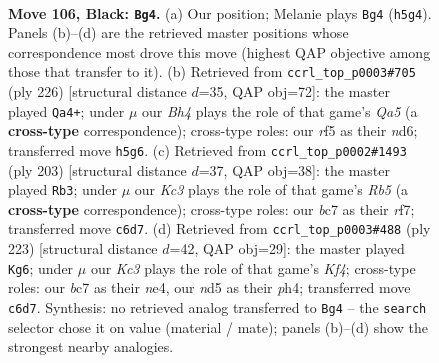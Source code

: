 \documentclass[11pt]{article}
\begin{document}
\clearpage

\begin{figure}[p]\centering
\begin{subfigure}{0.46\textwidth}\centering
\resizebox{\linewidth}{!}{%
\newchessgame
\chessboard[
  setfen={8/2B5/PPk5/3N1R1b/1K6/7p/8/8 b - - 0 106},
  showmover=false,
  pgfstyle=straightmove, color=movearrow, markmove={h5-g4}
]}
\caption{}
\end{subfigure}\hfill
\begin{subfigure}{0.46\textwidth}\centering
\resizebox{\linewidth}{!}{%
\newchessgame
\chessboard[
  setfen={8/3k4/3n4/Q7/4n3/5Kp1/5b2/8 w - - 8 114},
  showmover=false,
  pgfstyle=straightmove, color=movearrow, markmove={a5-a4}
]}
\caption{}
\end{subfigure}
\\[4pt]
\begin{subfigure}{0.46\textwidth}\centering
\resizebox{\linewidth}{!}{%
\newchessgame
\chessboard[
  setfen={8/5R2/8/3K2kP/1r3N2/8/8/8 b - - 36 102},
  showmover=false,
  pgfstyle=straightmove, color=movearrow, markmove={b4-b3}
]}
\caption{}
\end{subfigure}\hfill
\begin{subfigure}{0.46\textwidth}\centering
\resizebox{\linewidth}{!}{%
\newchessgame
\chessboard[
  setfen={8/7p/8/5k2/4Np1P/3K1P2/5B1r/8 b - - 82 112},
  showmover=false,
  pgfstyle=straightmove, color=movearrow, markmove={f5-g6}
]}
\caption{}
\end{subfigure}
\caption{\textbf{Move 106, Black: \texttt{Bg4}.} (a) Our position; Melanie plays \texttt{Bg4} (\texttt{h5g4}). Panels (b)--(d) are the retrieved master positions whose correspondence most drove this move (highest QAP objective among those that transfer to it). (b) Retrieved from \texttt{ccrl\_top\_p0003\#705} (ply 226) [structural distance $d$=35, QAP obj=72]: the master played \texttt{Qa4+}; under $\mu$ our \emph{Bh4} plays the role of that game's \emph{Qa5} (a \textbf{cross-type} correspondence); cross-type roles: our \emph{r}f5 as their \emph{n}d6; transferred move \texttt{h5g6}. (c) Retrieved from \texttt{ccrl\_top\_p0002\#1493} (ply 203) [structural distance $d$=37, QAP obj=38]: the master played \texttt{Rb3}; under $\mu$ our \emph{Kc3} plays the role of that game's \emph{Rb5} (a \textbf{cross-type} correspondence); cross-type roles: our \emph{b}c7 as their \emph{r}f7; transferred move \texttt{c6d7}. (d) Retrieved from \texttt{ccrl\_top\_p0003\#488} (ply 223) [structural distance $d$=42, QAP obj=29]: the master played \texttt{Kg6}; under $\mu$ our \emph{Kc3} plays the role of that game's \emph{Kf4}; cross-type roles: our \emph{b}c7 as their \emph{n}e4, our \emph{n}d5 as their \emph{p}h4; transferred move \texttt{c6d7}. Synthesis: no retrieved analog transferred to \texttt{Bg4} -- the \texttt{search} selector chose it on value (material / mate); panels (b)--(d) show the strongest nearby analogies.}
\label{fig:thought-m211}
\end{figure}
\end{document}
